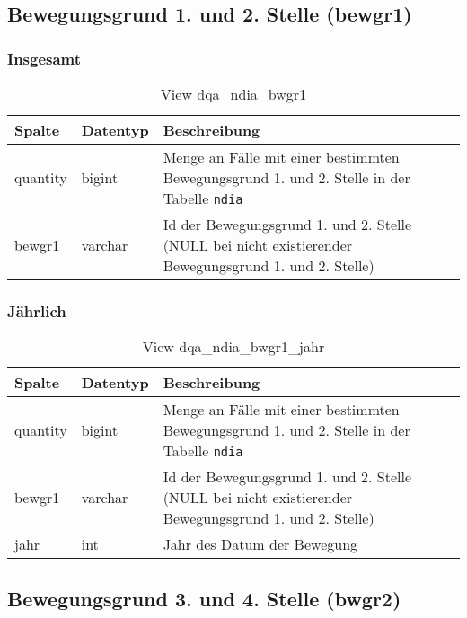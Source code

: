 \subsection{Bewegungsgrund 1. und 2. Stelle (bewgr1)} \label{subsec:bewgr1}

\subsubsection{Insgesamt} \label{subsubsec:bewg1I}

\begin{table}[ht]
	\centering   
	\caption{View dqa\_ndia\_bwgr1}
	\label{tab:bewG1I}
	\begin{tabular}{||l|l|p{10cm}||}   		
		\hline
		Spalte & Datentyp & Beschreibung \\ [0.5ex]
		\hline\hline
		quantity & bigint & Menge an Fälle mit einer bestimmten Bewegungsgrund 1. und 2. Stelle in der Tabelle \texttt{ndia} \\
		\hline
		bewgr1 & varchar & Id der Bewegungsgrund 1. und 2. Stelle (NULL bei nicht existierender Bewegungsgrund 1. und 2. Stelle)\\
		\hline
		
	\end{tabular}
\end{table}


\subsubsection{Jährlich} \label{subsubsec:bewg1J}

\begin{table}[ht]
	\centering   
	\caption{View dqa\_ndia\_bwgr1\_jahr}
	\label{tab:bewG1J}
	\begin{tabular}{||l|l|p{10cm}||}   		
		\hline
		Spalte & Datentyp & Beschreibung \\ [0.5ex]
		\hline\hline
		quantity & bigint & Menge an Fälle mit einer bestimmten Bewegungsgrund 1. und 2. Stelle in der Tabelle \texttt{ndia}\\
		\hline
		bewgr1 & varchar & Id der Bewegungsgrund 1. und 2. Stelle (NULL bei nicht existierender Bewegungsgrund 1. und 2. Stelle)\\
		\hline
		jahr & int &  Jahr des Datum der Bewegung \\
		\hline		
	\end{tabular}
\end{table}

\subsection{Bewegungsgrund 3. und 4. Stelle (bwgr2)} \label{subsec:bewgr2}

